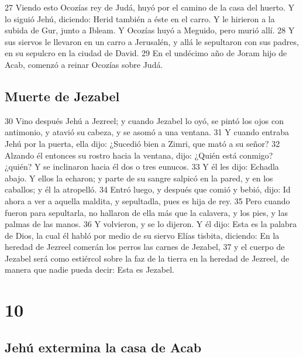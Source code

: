 27 Viendo esto Ocozías rey de Judá, huyó por el camino de la casa del huerto. Y lo siguió Jehú, diciendo: Herid también a éste en el carro. Y le hirieron a la subida de Gur, junto a Ibleam. Y Ocozías huyó a Meguido, pero murió allí.
28 Y sus siervos le llevaron en un carro a Jerusalén, y allá le sepultaron con sus padres, en su sepulcro en la ciudad de David.
29 En el undécimo año de Joram hijo de Acab, comenzó a reinar Ocozías sobre Judá.

\section*{Muerte de Jezabel}

30 Vino después Jehú a Jezreel; y cuando Jezabel lo oyó, se pintó los ojos con antimonio, y atavió su cabeza, y se asomó a una ventana.
31 Y cuando entraba Jehú por la puerta, ella dijo: ¿Sucedió bien a Zimri, que mató a su señor?
32 Alzando él entonces su rostro hacia la ventana, dijo: ¿Quién está conmigo? ¿quién? Y se inclinaron hacia él dos o tres eunucos.
33 Y él les dijo: Echadla abajo. Y ellos la echaron; y parte de su sangre salpicó en la pared, y en los caballos; y él la atropelló.
34 Entró luego, y después que comió y bebió, dijo: Id ahora a ver a aquella maldita, y sepultadla, pues es hija de rey.
35 Pero cuando fueron para sepultarla, no hallaron de ella más que la calavera, y los pies, y las palmas de las manos.
36 Y volvieron, y se lo dijeron. Y él dijo: Esta es la palabra de Dios, la cual él habló por medio de su siervo Elías tisbita, diciendo: En la heredad de Jezreel comerán los perros las carnes de Jezabel, 
37 y el cuerpo de Jezabel será como estiércol sobre la faz de la tierra en la heredad de Jezreel, de manera que nadie pueda decir: Esta es Jezabel.

\chapter{10}

\section*{Jehú extermina la casa de Acab}

